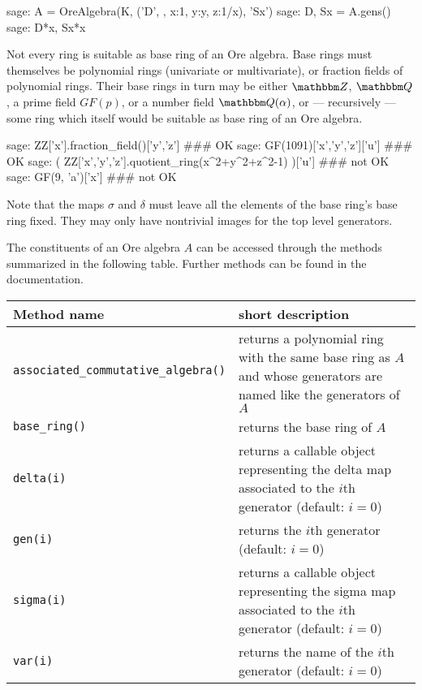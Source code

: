 \documentclass{amsart}
\let\set\mathbbm
\begin{document}
\begin{sageexample}
  sage: A = OreAlgebra(K, ('D', {}, {x:1, y:y, z:1/x}), 'Sx')
  sage: D, Sx = A.gens()
  sage: D*x, Sx*x
\end{sageexample}

Not every ring is suitable as base ring of an Ore algebra. Base rings must
themselves be polynomial rings (univariate or multivariate), or fraction 
fields of polynomial rings. Their base rings in turn may be either $\set Z$,
$\set Q$, a prime field $GF(p)$, or a number field $\set Q(\alpha)$, or
--- recursively --- some ring which itself would be suitable as base ring
of an Ore algebra. 

\begin{sageexample}
  sage: ZZ['x'].fraction_field()['y','z'] ### OK
  sage: GF(1091)['x','y','z']['u'] ### OK
  sage: ( ZZ['x','y','z'].quotient_ring(x^2+y^2+z^2-1) )['u'] ### not OK
  sage: GF(9, 'a')['x'] ### not OK
\end{sageexample}

Note that the maps $\sigma$ and $\delta$ must leave all the elements of
the base ring's base ring fixed. They may only have nontrivial images for
the top level generators. 

The constituents of an Ore algebra $A$ can be accessed through the methods
summarized in the following table. Further methods can be found in the 
documentation. 

\begin{center}
  \begin{tabular}{|l|p{.55\hsize}|}
    \hline
    Method name & short description \\\hline
    \verb|associated_commutative_algebra()| & returns a polynomial ring with the
       same base ring as $A$ and whose generators are named like the generators
       of~$A$\\
    \verb|base_ring()| & returns the base ring of $A$\\
    \verb|delta(i)| & returns a callable object representing the delta map
       associated to the $i$th generator (default: $i=0$) \\
    \verb|gen(i)| & returns the $i$th generator (default: $i=0$)\\
    \verb|sigma(i)| & returns a callable object representing the sigma map
       associated to the $i$th generator (default: $i=0$) \\
    \verb|var(i)| & returns the name of the $i$th generator (default: $i=0$)\\\hline
  \end{tabular}
\end{center}
\end{document}
